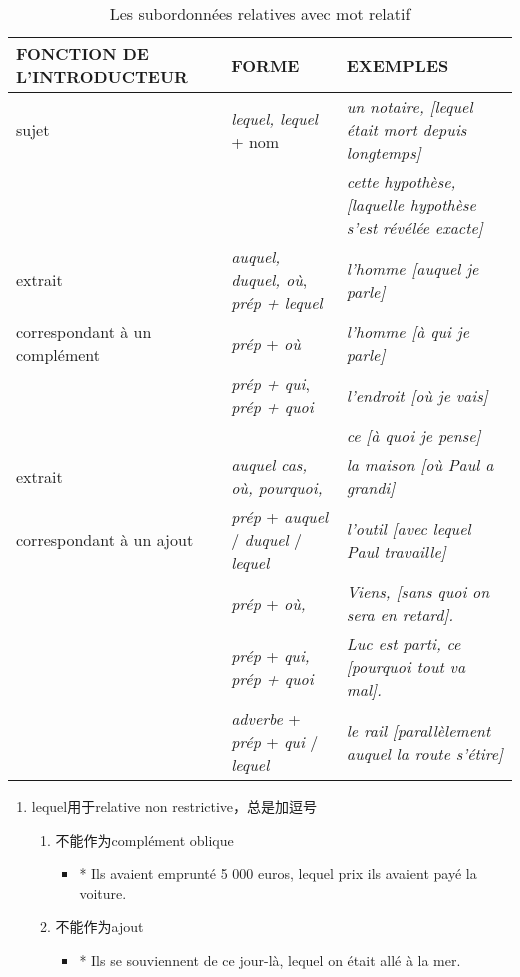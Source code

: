 \documentclass[UTF8]{report}
\begin{document}
\begin{table}[H]
    \centering
    \small
    \begin{tabular}{|l|l|l|}
    \hline
    \rowcolor{cyan!20}
    \textbf{FONCTION DE L'INTRODUCTEUR} & \textbf{FORME} & \textbf{EXEMPLES} \\
    \hline
    sujet & \textit{lequel, lequel} + nom & \textit{un notaire, [lequel était mort depuis longtemps]} \\
    & & \textit{cette hypothèse, [laquelle hypothèse s'est révélée exacte]} \\
    \hline
    extrait & \textit{auquel, duquel, où}, \textit{prép + lequel} & \textit{l'homme [auquel je parle]} \\
    correspondant à un complément & \textit{prép} + \textit{où} & \textit{l'homme [à qui je parle]} \\
    & \textit{prép + qui}, \textit{prép + quoi} & \textit{l'endroit [où je vais]} \\
    & & \textit{ce [à quoi je pense]} \\
    \hline
    extrait & \textit{auquel cas, où, pourquoi,} & \textit{la maison [où Paul a grandi]} \\
    correspondant à un ajout & \textit{prép} + \textit{auquel} / \textit{duquel} / \textit{lequel} & \textit{l'outil [avec lequel Paul travaille]} \\
    & \textit{prép} + \textit{où,} & \textit{Viens, [sans quoi on sera en retard].} \\
    & \textit{prép} + \textit{qui, prép + quoi}& \textit{Luc est parti, ce [pourquoi tout va mal].} \\
    & \textit{adverbe} + \textit{prép} + \textit{qui} / \textit{lequel} & \textit{le rail [parallèlement auquel la route s'étire]} \\
    \hline
    \end{tabular}
    \caption{Les subordonnées relatives avec mot relatif}
\end{table}

\begin{enumerate}
    \item lequel用于relative non restrictive，总是加逗号
    \begin{enumerate}
        \item 不能作为complément oblique
        \begin{itemize}
            \item * Ils avaient emprunté 5 000 euros, lequel prix ils avaient payé la voiture.
        \end{itemize}
        \item 不能作为ajout
        \begin{itemize}
            \item * Ils se souviennent de ce jour-là, lequel on était allé à la mer.
        \end{itemize}
    \end{enumerate}
\end{enumerate}
\end{document}
